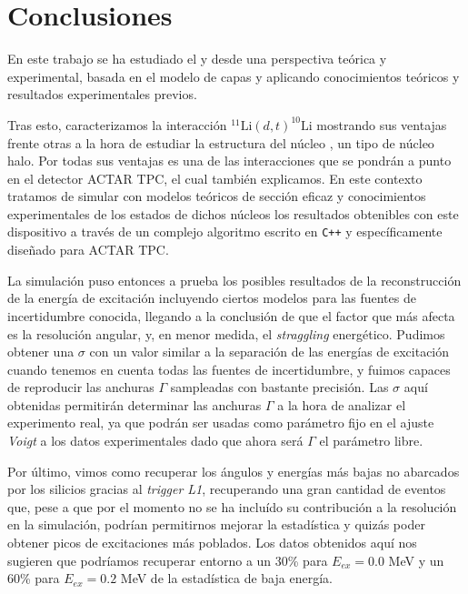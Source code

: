 
\section{Conclusiones}


En este trabajo se ha estudiado el \litioDiez y \litioOnce desde una perspectiva teórica y experimental, basada en el modelo de capas y aplicando conocimientos teóricos y resultados experimentales previos. 

Tras esto, caracterizamos la interacción $^{11}\text{Li}(d,t)^{10}\text{Li}$ mostrando sus ventajas frente otras a la hora de estudiar la estructura del núcleo \litioOnce, un tipo de núcleo halo. Por todas sus ventajas es una de las interacciones que se pondrán a punto en el detector ACTAR TPC, el cual también explicamos. En este contexto tratamos de simular con modelos teóricos de sección eficaz y conocimientos experimentales de los estados de dichos núcleos los resultados obtenibles con este dispositivo a través de un complejo algoritmo escrito en \verb|C++| y específicamente diseñado para ACTAR TPC. 

La simulación puso entonces a prueba los posibles resultados de la reconstrucción de la energía de excitación incluyendo ciertos modelos para las fuentes de incertidumbre conocida, llegando a la conclusión de que el factor que más afecta es la resolución angular, y, en menor medida, el \textit{straggling} energético. Pudimos obtener una $\sigma$ con un valor similar a la separación de las energías de excitación cuando tenemos en cuenta todas las fuentes de incertidumbre, y fuimos capaces de reproducir las anchuras $\Gamma$ sampleadas con bastante precisión. Las $\sigma$ aquí obtenidas permitirán determinar las anchuras $\Gamma$ a la hora de analizar el experimento real, ya que podrán ser usadas como parámetro fijo en el ajuste \textit{Voigt} a los datos experimentales dado que ahora será $\Gamma$ el parámetro libre. 

Por último, vimos como recuperar los ángulos y energías más bajas no abarcados por los silicios gracias al \textit{trigger L1}, recuperando una gran cantidad de eventos que, pese a que por el momento no se ha incluído su contribución a la resolución en la simulación, podrían permitirnos mejorar la estadística y quizás poder obtener picos de excitaciones más poblados. Los datos obtenidos aquí nos sugieren que podríamos recuperar entorno a un 30\% para $E_{ex}=0.0$ MeV  y un 60\% para $E_{ex}=0.2$ MeV de la estadística de baja energía.


